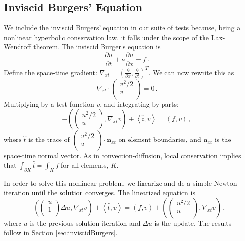 \documentclass[letterpaper]{article}
\newcommand{\LRp}[1]{\left( #1 \right)}
\newcommand{\LRa}[1]{\left\langle #1 \right\rangle}
\newcommand{\Grad} {\ensuremath{\nabla}}
\def\vecttwo#1#2{\left(
\begin{array}{c}
#1\\
#2\\
\end{array}
\right)}
\begin{document}
\subsection{Inviscid Burgers' Equation}
We include the inviscid Burgers' equation in our suite of tests because, being
a nonlinear hyperbolic conservation law, it
falls under the scope of the Lax-Wendroff theorem. %
The inviscid Burger's equation is
\[
\frac{\partial u}{\partial t}+u\frac{\partial u}{\partial x}=f\,.
\]
Define the space-time gradient: $\Grad_{xt}=\LRp{\frac{\partial}{\partial
x},\frac{\partial}{\partial t}}^T$. We can now rewrite this as
\[
\Grad_{xt}\cdot\vecttwo{u^2/2}{u}=0\,.
\]
Multiplying by a test function $v$, and integrating by parts:
\[
-\LRp{\vecttwo{u^2/2}{u},\Grad_{xt}v}+\LRa{\hat t,v}=\LRp{f,v}\,,
\]
where $\hat t$ is the trace of $\vecttwo{u^2/2}{u}\cdot\mathbf{n}_{xt}$ on
element boundaries, and $\mathbf{n}_{xt}$ is the space-time normal vector.
As in convection-diffusion, local conservation implies that
$\int_{\partial K}\hat t=\int_Kf$ for all elements, $K$.

In order to solve this nonlinear problem, we linearize and do a simple Newton iteration
until the solution converges. The linearized equation is
\[
-\LRp{\vecttwo{u}{1}\Delta u,\Grad_{xt}v}+\LRa{\hat t,v}=\LRp{f,v}
+\LRp{\vecttwo{u^2/2}{u},\Grad_{xt}v} \,,
\]
where $u$ is the previous solution iteration and $\Delta u$ is the update.
The results follow in Section \ref{sec:inviscidBurgers}.
\end{document}
